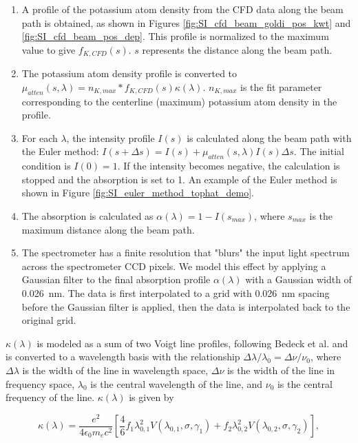 \begin{enumerate}
    \item A profile of the potassium atom density from the CFD data along the beam path is obtained, as shown in Figures \ref{fig:SI_cfd_beam_goldi_pos_kwt} and \ref{fig:SI_cfd_beam_pos_dep}. This profile is normalized to the maximum value to give $f_{K, CFD} (s)$. $s$ represents the distance along the beam path.
    \item The potassium atom density profile is converted to $\mu_{atten} (s, \lambda) = n_{K,max}* f_{K, CFD} (s) \kappa(\lambda)$. $n_{K,max}$ is the fit parameter corresponding to the centerline (maximum) potassium atom density in the profile.
    \item For each $\lambda$, the intensity profile $I(s)$ is calculated along the beam path with the Euler method: $I(s + \Delta s) = I(s) + \mu_{atten}(s, \lambda) I(s) \Delta s$. The initial condition is $I(0) = 1$. If the intensity becomes negative, the calculation is stopped and the absorption is set to 1. An example of the Euler method is shown in Figure \ref{fig:SI_euler_method_tophat_demo}.
    \item The absorption is calculated as $\alpha(\lambda) = 1 - I(s_{max})$, where $s_{max}$ is the maximum distance along the beam path. 
    \item The spectrometer has a finite resolution that "blurs" the input light spectrum across the spectrometer CCD pixels. We model this effect by applying a Gaussian filter to the final absorption profile $\alpha(\lambda)$ with a Gaussian width of \SI{0.026}{\nano\meter}. The data is first interpolated to a grid with \SI{0.026}{\nano\meter} spacing before the Gaussian filter is applied, then the data is interpolated back to the original grid.
\end{enumerate}

$\kappa(\lambda)$ is modeled as a sum of two Voigt line profiles, following Bedeck et al.\cite{bedickDeterminationElectricalConductivity2019} and is converted to a wavelength basis with the relationship $\Delta \lambda/\lambda_0 = \Delta \nu/\nu_0$, where $\Delta \lambda$ is the width of the line in wavelength space, $\Delta \nu$ is the width of the line in frequency space, $\lambda_0$ is the central wavelength of the line, and $\nu_0$ is the central frequency of the line. $\kappa(\lambda)$ is given by %

\begin{equation}
    \label{eq:cross_section_alpha_fit}
    \kappa(\lambda) = \frac{e^2}{4 \epsilon_0 m_e c^2} \left[ \frac{4}{6} f_1 \lambda_{0,1}^2 V(\lambda_{0,1},\sigma,\gamma_1) + f_2 \lambda_{0,2}^2 V(\lambda_{0,2},\sigma,\gamma_2) \right],
\end{equation}

